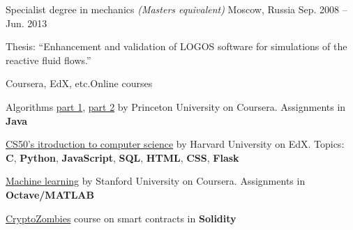\begin{cventries}
{Specialist degree in mechanics \emph{(Masters equivalent)}}
    {Moscow, Russia}
    {Sep. 2008 -- Jun. 2013}
    {
      \begin{cvitems}
        \item{Thesis: ``Enhancement and validation of LOGOS software for simulations of the reactive fluid flows.''}
      \end{cvitems}
    }
 \cventry
    {Coursera, EdX, etc.}{Online courses}{}{}
    {
        \begin{cvitems}
            \item Algorithms \href{https://www.coursera.org/learn/algorithms-part1}{part 1}, \href{https://www.coursera.org/learn/algorithms-part2}{part 2} by Princeton University on Coursera. Assignments in \textbf{Java}
            \item \href{https://cs50.harvard.edu/x/2022/syllabus/}{CS50's itroduction to computer science} by Harvard University on EdX. Topics: \textbf{C}, \textbf{Python}, \textbf{JavaScript}, \textbf{SQL}, \textbf{HTML}, \textbf{CSS}, \textbf{Flask}
            \item \href{https://www.coursera.org/learn/machine-learning}{Machine learning} by Stanford University on Coursera. Assignments in \textbf{Octave/MATLAB}
            \item \href{https://cryptozombies.io/}{CryptoZombies} course on smart contracts in \textbf{Solidity}
        \end{cvitems}
    }
\end{cventries}
